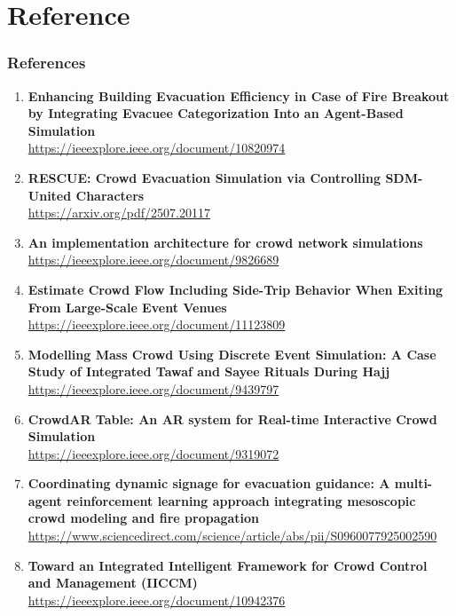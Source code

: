 \documentclass{beamer}
\begin{document}
\section{Reference}
\begin{frame}[allowframebreaks]
\frametitle{References}
\scriptsize %

\begin{enumerate}
    \item \textbf{Enhancing Building Evacuation Efficiency in Case of Fire Breakout by Integrating Evacuee Categorization Into an Agent-Based Simulation}\\
    \url{https://ieeexplore.ieee.org/document/10820974}
    
    \item \textbf{RESCUE: Crowd Evacuation Simulation via Controlling SDM-United Characters}\\
    \url{https://arxiv.org/pdf/2507.20117}
    
    \item \textbf{An implementation architecture for crowd network simulations}\\
    \url{https://ieeexplore.ieee.org/document/9826689}
    
    \item \textbf{Estimate Crowd Flow Including Side-Trip Behavior When Exiting From Large-Scale Event Venues}\\
    \url{https://ieeexplore.ieee.org/document/11123809}
    
    \item \textbf{Modelling Mass Crowd Using Discrete Event Simulation: A Case Study of Integrated Tawaf and Sayee Rituals During Hajj}\\
    \url{https://ieeexplore.ieee.org/document/9439797}
    
    \item \textbf{CrowdAR Table: An AR system for Real-time Interactive Crowd Simulation}\\
    \url{https://ieeexplore.ieee.org/document/9319072}
    
    \item \textbf{Coordinating dynamic signage for evacuation guidance: A multi-agent reinforcement learning approach integrating mesoscopic crowd modeling and fire propagation}\\
    \url{https://www.sciencedirect.com/science/article/abs/pii/S0960077925002590}
    
    \item \textbf{Toward an Integrated Intelligent Framework for Crowd Control and Management (IICCM)}\\
    \url{https://ieeexplore.ieee.org/document/10942376}
\end{enumerate}

\end{frame}
\end{document}
